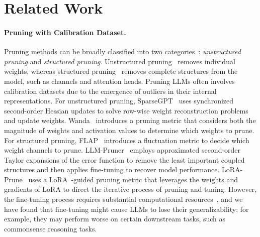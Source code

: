 \section{Related Work}
\vspace{-0.3cm}
\paragraph{Pruning with Calibration Dataset.} Pruning methods can be broadly classified into two categories~\citep{yuan2021mest}: \textit{unstructured pruning} and \textit{structured pruning}. Unstructured pruning~\citep{lecun1989optimal, hassibi1993optimal, han2015learning, mushtaq2021spider, li2021ell, soltani2021information, yang2022theoretical, diao2023pruning, liu2023sparsity, li2024adaptive, li2024discovering, dong2024pruner} removes individual weights, whereas structured pruning~\citep{li2016pruning, liu2017learning, he2019filter, diao2020drasic, fang2023depgraph} removes complete structures from the model, such as channels and attention heads. Pruning LLMs often involves calibration datasets due to the emergence of outliers in their internal representations. For unstructured pruning, SparseGPT~\citep{frantar2023sparsegpt} uses synchronized second-order Hessian updates to solve row-wise weight reconstruction problems and update weights. Wanda~\citep{sun2023simple} introduces a pruning metric that considers both the magnitude of weights and activation values to determine which weights to prune. For structured pruning, FLAP~\citep{an2023fluctuation} introduces a fluctuation metric to decide which weight channels to prune. LLM-Pruner~\citep{ma2023llm} employs approximated second-order Taylor expansions of the error function to remove the least important coupled structures and then applies fine-tuning to recover model performance. LoRA-Prune~\citep{zhang2023pruning} uses a LoRA~\citep{hu2021lora}-guided pruning metric that leverages the weights and gradients of LoRA to direct the iterative process of pruning and tuning. However, the fine-tuning process requires substantial computational resources~\citep{hoffmann2022training}, and we have found that fine-tuning might cause LLMs to lose their generalizability; for example, they may perform worse on certain downstream tasks, such as commonsense reasoning tasks.
\vspace{-0.3cm}
